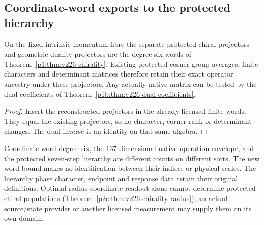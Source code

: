 \documentclass[12pt,a4paper]{article}
\begin{document}
\subsection{Coordinate-word exports to the protected hierarchy}
\label{p3c:sec:v226-hierarchy-exports}
\begin{corollary}
\label{p3c:cor:v226-hierarchy-projectors}
On the fixed intrinsic momentum fibre the separate protected chiral
projectors and geometric duality projectors are the degree-six words of
Theorem~\ref{p1:thm:v226-chirality}. Existing protected-corner group averages,
finite characters and determinant matrices therefore retain their exact
operator ancestry under these projectors. Any actually native matrix can
be tested by the dual coefficients of
Theorem~\ref{p1b:thm:v226-dual-coefficients}.
\end{corollary}
\begin{proof}
Insert the reconstructed projectors in the already licensed finite words.
They equal the existing projectors, so no character, corner rank or determinant
changes. The dual inverse is an identity on that same algebra.
\end{proof}
Coordinate-word degree six, the 137-dimensional native operation envelope,
and the protected seven-step hierarchy are different counts on different
sorts. The new word bound makes no identification between their indices or
physical scales. The hierarchy phase character, endpoint and response data
retain their original definitions. Optimal-radius coordinate readout alone
cannot determine protected chiral populations
(Theorem~\ref{p2c:thm:v226-chirality-radius}); an actual source/state provider
or another licensed measurement may supply them on its own domain.
\end{document}
